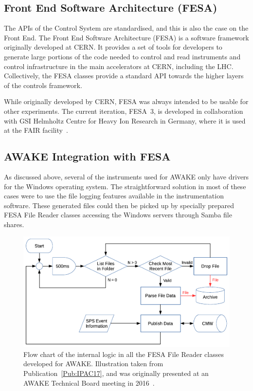 \subsection{Front End Software Architecture (FESA)}
\label{DAQ:FESA}

The APIs of the Control System are standardised, and this is also the case on the Front End.
The Front End Software Architecture (FESA) is a software framework originally developed at CERN.
It provides a set of tools for developers to generate large portions of the code needed to control and read instruments and control infrastructure in the main accelerators at CERN, including the LHC.
Collectively, the FESA classes provide a standard API towards the higher layers of the controls framework.

While originally developed by CERN, FESA was always intended to be usable for other experiments.
The current iteration, FESA~3, is developed in collaboration with GSI Helmholtz Centre for Heavy Ion Research in Germany, where it is used at the FAIR facility~\cite{schwinn:2010}.

\subsection{AWAKE Integration with FESA}
\label{DAQ:Integration}

As discussed above, several of the instruments used for AWAKE only have drivers for the Windows operating system.
The straightforward solution in most of these cases were to use the file logging features available in the instrumentation software.
These generated files could then be picked up by specially prepared FESA File Reader classes accessing the Windows servers through Samba file shares.

\begin{figure}[hbt]
    \centering
    \includegraphics[width=0.85\linewidth,trim={0mm 0mm 0mm 0mm},clip]{figures/FileReader}
    \caption{\label{Fig:DAQ:Reader}
        Flow chart of the internal logic in all the FESA File Reader classes developed for AWAKE.
        Illustration taken from Publication~\ref{Pub:IPAC17}, and was originally presented at an AWAKE Technical Board meeting in 2016~\cite{add:berglyd_olsen:2016}.
    }
\end{figure}

